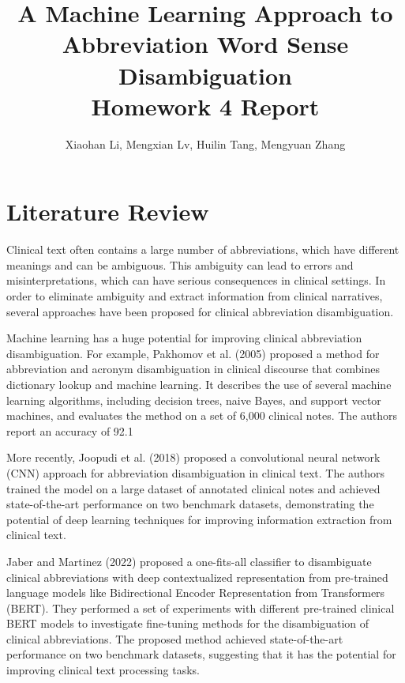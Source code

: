 \documentclass{article}
\author{Xiaohan Li, Mengxian Lv, Huilin Tang, Mengyuan Zhang}
\title{\huge{A Machine Learning Approach to Abbreviation Word Sense Disambiguation}\\
\LARGE{Homework 4 Report}}
\begin{document}
    \begin{titlepage}
        \maketitle    
    \end{titlepage}
    \tableofcontents
    \newpage
    \section{Literature Review}
    Clinical text often contains a large number of abbreviations, which have different meanings and can be ambiguous. This ambiguity can lead to errors and misinterpretations, which can have serious consequences in clinical settings. In order to eliminate ambiguity and extract information from clinical narratives, several approaches have been proposed for clinical abbreviation disambiguation.

    Machine learning has a huge potential for improving clinical abbreviation disambiguation. For example, Pakhomov et al. (2005) proposed a method for abbreviation and acronym disambiguation in clinical discourse that combines dictionary lookup and machine learning.\cite{pakhomov2005abbreviation} It describes the use of several machine learning algorithms, including decision trees, naive Bayes, and support vector machines, and evaluates the method on a set of 6,000 clinical notes. The authors report an accuracy of 92.1%

    More recently, Joopudi et al. (2018) proposed a convolutional neural network (CNN) approach for abbreviation disambiguation in clinical text.\cite{joopudi2018convolutional} The authors trained the model on a large dataset of annotated clinical notes and achieved state-of-the-art performance on two benchmark datasets, demonstrating the potential of deep learning techniques for improving information extraction from clinical text.

    Jaber and Martinez (2022) proposed a one-fits-all classifier to disambiguate clinical abbreviations with deep contextualized representation from pre-trained language models like Bidirectional Encoder Representation from Transformers (BERT).\cite{jaber2022disambiguating} They performed a set of experiments with different pre-trained clinical BERT models to investigate fine-tuning methods for the disambiguation of clinical abbreviations. The proposed method achieved state-of-the-art performance on two benchmark datasets, suggesting that it has the potential for improving clinical text processing tasks.
\end{document}
